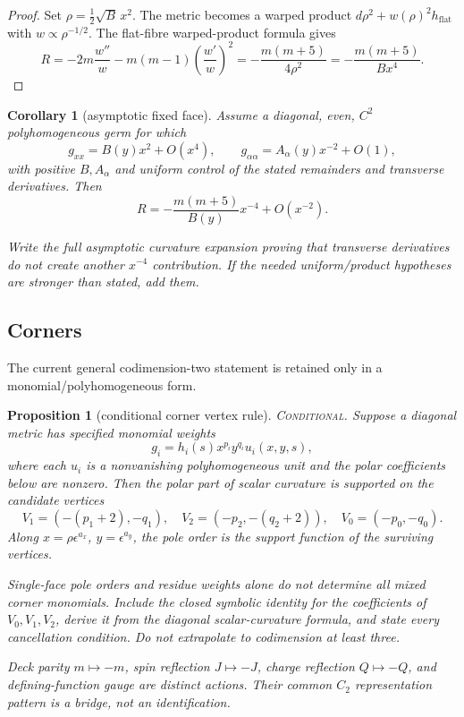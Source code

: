 \documentclass[11pt]{article}
\newtheorem{proposition}[theorem]{Proposition}
\newtheorem{corollary}[theorem]{Corollary}
\theoremstyle{remark}
\newcommand{\status}[1]{\textup{\textsc{#1}}}
\newcommand{\conditional}{\status{Conditional}}
\newcommand{\proofstop}[1]{\par\medskip\noindent{\color{red!75!black}\textbf{STOP--PROOF.}} \textit{#1}\par\medskip}
\begin{document}
\begin{proof}
Set $\rho=\frac12\sqrt B\,x^2$. The metric becomes a warped product
$d\rho^2+w(\rho)^2h_{\mathrm{flat}}$ with
$w\propto\rho^{-1/2}$. The flat-fibre warped-product formula gives
\[
R=-2m\frac{w''}{w}
-m(m-1)\left(\frac{w'}w\right)^2
=-\frac{m(m+5)}{4\rho^2}
=-\frac{m(m+5)}{Bx^4}.
\]
\end{proof}

\begin{corollary}[asymptotic fixed face]
Assume a diagonal, even, $C^2$ polyhomogeneous germ for which
\[
g_{xx}=B(y)x^2+O(x^4),\qquad
g_{\alpha\alpha}=A_\alpha(y)x^{-2}+O(1),
\]
with positive $B,A_\alpha$ and uniform control of the stated remainders
and transverse derivatives. Then
\[
R=-\frac{m(m+5)}{B(y)}x^{-4}+O(x^{-2}).
\]
\end{corollary}

\proofstop{Write the full asymptotic curvature expansion proving that
transverse derivatives do not create another $x^{-4}$ contribution. If the
needed uniform/product hypotheses are stronger than stated, add them.}

\subsection{Corners}

The current general codimension-two statement is retained only in a
monomial/polyhomogeneous form.

\begin{proposition}[conditional corner vertex rule]\label{prop:corner}
\conditional.
Suppose a diagonal metric has specified monomial weights
\[
g_i=h_i(s)x^{p_i}y^{q_i}u_i(x,y,s),
\]
where each $u_i$ is a nonvanishing polyhomogeneous unit and the polar
coefficients below are nonzero. Then the polar part of scalar curvature is
supported on the candidate vertices
\[
V_1=(-(p_1+2),-q_1),\quad
V_2=(-p_2,-(q_2+2)),\quad
V_0=(-p_0,-q_0).
\]
Along $x=\rho\epsilon^{a_x}$, $y=\epsilon^{a_y}$, the pole order is
the support function of the surviving vertices.
\end{proposition}

\proofstop{Single-face pole orders and residue weights alone do not
determine all mixed corner monomials. Include the closed symbolic identity
for the coefficients of $V_0,V_1,V_2$, derive it from the diagonal
scalar-curvature formula, and state every cancellation condition. Do not
extrapolate to codimension at least three.}

\proofstop{Deck parity $m\mapsto-m$, spin reflection $J\mapsto-J$,
charge reflection $Q\mapsto-Q$, and defining-function gauge are distinct
actions. Their common $C_2$ representation pattern is a bridge, not an
identification.}
\end{document}
